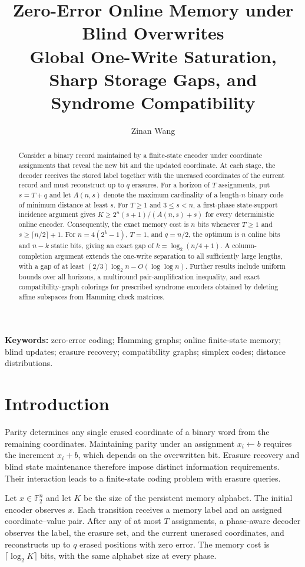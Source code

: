 \documentclass[11pt,a4paper]{article}
\title{\textbf{Zero-Error Online Memory under Blind Overwrites}\\[4pt]\large Global One-Write Saturation, Sharp Storage Gaps, and Syndrome Compatibility}
\author{Zinan Wang}
\date{}
\begin{document}
\maketitle
\begin{abstract}
Consider a binary record maintained by a finite-state encoder under coordinate assignments that reveal the new bit and the updated coordinate. At each stage, the decoder receives the stored label together with the unerased coordinates of the current record and must reconstruct up to $q$ erasures. For a horizon of $T$ assignments, put $s=T+q$ and let $A(n,s)$ denote the maximum cardinality of a length-$n$ binary code of minimum distance at least $s$. For $T\ge1$ and $3\le s<n$, a first-phase state-support incidence argument gives $K\ge 2^n(s+1)/(A(n,s)+s)$ for every deterministic online encoder. Consequently, the exact memory cost is $n$ bits whenever $T\ge1$ and $s\ge\lceil n/2\rceil+1$. For $n=4(2^k-1)$, $T=1$, and $q=n/2$, the optimum is $n$ online bits and $n-k$ static bits, giving an exact gap of $k=\log_2(n/4+1)$. A column-completion argument extends the one-write separation to all sufficiently large lengths, with a gap of at least $(2/3)\log_2 n-O(\log\log n)$. Further results include uniform bounds over all horizons, a multiround pair-amplification inequality, and exact compatibility-graph colorings for prescribed syndrome encoders obtained by deleting affine subspaces from Hamming check matrices.
\end{abstract}
\noindent\textbf{Keywords:} zero-error coding; Hamming graphs; online finite-state memory; blind updates; erasure recovery; compatibility graphs; simplex codes; distance distributions.

\section{Introduction}
Parity determines any single erased coordinate of a binary word from the remaining coordinates. Maintaining parity under an assignment $x_i\gets b$ requires the increment $x_i+b$, which depends on the overwritten bit. Erasure recovery and blind state maintenance therefore impose distinct information requirements. Their interaction leads to a finite-state coding problem with erasure queries.

Let $x\in\mathbb F_2^n$ and let $K$ be the size of the persistent memory alphabet. The initial encoder observes $x$. Each transition receives a memory label and an assigned coordinate--value pair. After any of at most $T$ assignments, a phase-aware decoder observes the label, the erasure set, and the current unerased coordinates, and reconstructs up to $q$ erased positions with zero error. The memory cost is $\lceil\log_2 K\rceil$ bits, with the same alphabet size at every phase.
\end{document}
